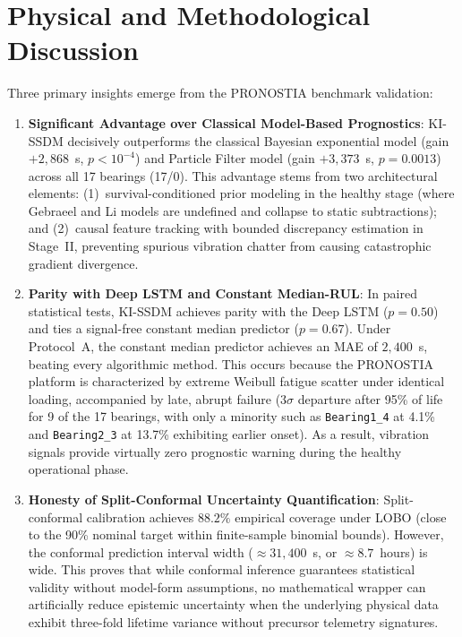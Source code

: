\documentclass[11pt,a4paper]{article}
\begin{document}
\section{Physical and Methodological Discussion}
\label{sec:annex_discussion}

Three primary insights emerge from the PRONOSTIA benchmark validation:
\begin{enumerate}[label=(\alph*),leftmargin=2.2em]
    \item \textbf{Significant Advantage over Classical Model-Based Prognostics}: KI-SSDM decisively outperforms the classical Bayesian exponential model (gain $+2{,}868$~s, $p < 10^{-4}$) and Particle Filter model (gain $+3{,}373$~s, $p = 0.0013$) across all 17 bearings (17/0). This advantage stems from two architectural elements: (1)~survival-conditioned prior modeling in the healthy stage (where Gebraeel and Li models are undefined and collapse to static subtractions); and (2)~causal feature tracking with bounded discrepancy estimation in Stage~II, preventing spurious vibration chatter from causing catastrophic gradient divergence.
    \item \textbf{Parity with Deep LSTM and Constant Median-RUL}: In paired statistical tests, KI-SSDM achieves parity with the Deep LSTM ($p=0.50$) and ties a signal-free constant median predictor ($p=0.67$). Under Protocol~A, the constant median predictor achieves an MAE of $2{,}400$~s, beating every algorithmic method. This occurs because the PRONOSTIA platform is characterized by extreme Weibull fatigue scatter under identical loading, accompanied by late, abrupt failure ($3\sigma$ departure after 95\% of life for 9 of the 17 bearings, with only a minority such as \texttt{Bearing1\_4} at 4.1\% and \texttt{Bearing2\_3} at 13.7\% exhibiting earlier onset). As a result, vibration signals provide virtually zero prognostic warning during the healthy operational phase.
    \item \textbf{Honesty of Split-Conformal Uncertainty Quantification}: Split-conformal calibration achieves $88.2\%$ empirical coverage under LOBO (close to the 90\% nominal target within finite-sample binomial bounds). However, the conformal prediction interval width ($\approx 31{,}400$~s, or $\approx 8.7$~hours) is wide. This proves that while conformal inference guarantees statistical validity without model-form assumptions, no mathematical wrapper can artificially reduce epistemic uncertainty when the underlying physical data exhibit three-fold lifetime variance without precursor telemetry signatures.
\end{enumerate}
\end{document}
